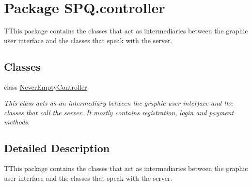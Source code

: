\hypertarget{namespace_s_p_q_1_1controller}{}\section{Package S\+P\+Q.\+controller}
\label{namespace_s_p_q_1_1controller}


T\+This package contains the classes that act as intermediaries between the graphic user interface and the classes that speak with the server.  


\subsection*{Classes}
\begin{DoxyCompactItemize}
\item 
class \mbox{\hyperlink{class_s_p_q_1_1controller_1_1_never_empty_controller}{Never\+Empty\+Controller}}
\begin{DoxyCompactList}\small\item\em This class acts as an intermediary between the graphic user interface and the classes that call the server. It mostly contains registration, login and payment methods. \end{DoxyCompactList}\end{DoxyCompactItemize}


\subsection{Detailed Description}
T\+This package contains the classes that act as intermediaries between the graphic user interface and the classes that speak with the server. 